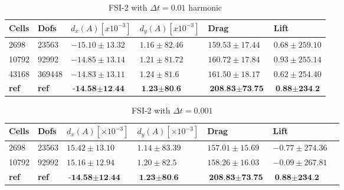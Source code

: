 \begin{table}[H]
\centering
\caption{FSI-2 with $\Delta t = 0.01$ harmonic}
\label{my-label}
\begin{tabular}{|l|l|l|l|l|l|}
\hline
Cells & Dofs & $d_x(A) [x10^{-3}]$ & $d_y(A) [x10^{-3}]$ & Drag & Lift \\ \hline
2698 & 23563 & $ -15.10 \pm 13.32 $ & $1.16 \pm 82.46 $ & $ 159.53 \pm 17.44 $ & $ 0.68 \pm 259.10 $ \\ \hline
10792 & 92992 & $ -14.85 \pm 13.14 $ & $1.21 \pm 81.72 $ & $ 160.72 \pm 17.84  $ & $0.93 \pm 255.14 $ \\ \hline
43168 & 369448 & $ -14.83  \pm 13.11  $ & $ 1.24 \pm 81.6 $ & $ 161.50 \pm 18.17  $ & $0.62 \pm 254.40  $ \\ \hline
\textbf{ref} & \textbf{ref} & $\textbf{-14.58} \pm \textbf{12.44}$ & $\textbf{1.23} \pm \textbf{80.6}$ & $\textbf{208.83} \pm \textbf{73.75}  $ & $\textbf{0.88} \pm \textbf{234.2} $ \\ \hline
\end{tabular}
\end{table}

\begin{table}[H]
\centering
\caption{FSI-2 with $\Delta t = 0.001$}
\label{my-label}
\begin{tabular}{|l|l|l|l|l|l|l|}
\hline
Cells & Dofs & $d_x(A) [\times10^{-3}]$ & $d_y(A) [\times10^{-3}]$ & Drag & Lift  \\ \hline
2698 & 23563 & $ 15.42 \pm 13.10$ & $1.14 \pm 83.39$ & $157.01 \pm 15.69$ & $ -0.77 \pm 274.36$  \\ \hline
10792 & 92992 & $ 15.16 \pm 12.94$ & $ 1.20 \pm 82.5 $ & $ 158.26 \pm 16.03$ & $ -0.09 \pm 267.81$  \\ \hline
\textbf{ref} & \textbf{ref} & $\textbf{-14.58} \pm \textbf{12.44}$ & $\textbf{1.23} \pm \textbf{80.6}$ & $\textbf{208.83} \pm \textbf{73.75}  $ & $\textbf{0.88} \pm \textbf{234.2} $ \\ \hline
\end{tabular}
\end{table}

